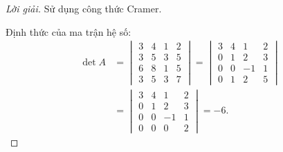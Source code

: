 \begin{proof}[Lời giải]
    Sử dụng công thức Cramer.
    
    Định thức của ma trận hệ số:
    \begingroup{}
    \allowdisplaybreaks{}
    \begin{align*}
        \det A & =
        \begin{vmatrix}
            3 & 4 & 1 & 2 \\
            3 & 5 & 3 & 5 \\
            6 & 8 & 1 & 5 \\
            3 & 5 & 3 & 7
        \end{vmatrix}
        =
        \begin{vmatrix}
            3 & 4 & 1  & 2 \\
            0 & 1 & 2  & 3 \\
            0 & 0 & -1 & 1 \\
            0 & 1 & 2  & 5
        \end{vmatrix} \\
               & =
        \begin{vmatrix}
            3 & 4 & 1  & 2 \\
            0 & 1 & 2  & 3 \\
            0 & 0 & -1 & 1 \\
            0 & 0 & 0  & 2
        \end{vmatrix}
        = -6.
    \end{align*}
    \endgroup{}
    

\end{proof}
